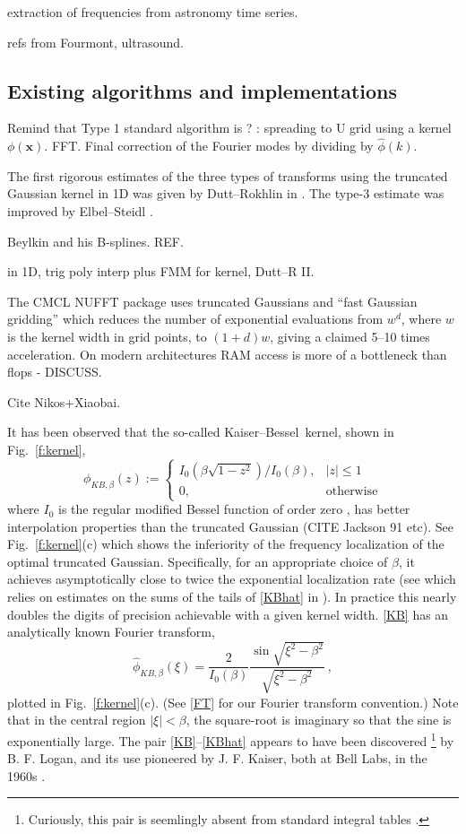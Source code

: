 \documentclass[10pt]{article}
\newcommand{\be}{\begin{equation}}
\newcommand{\ee}{\end{equation}}
\newcommand{\mbf}[1]{{\mathbf #1}}
\newcommand{\xx}{\mbf{x}}
\newcommand{\freq}{\beta}          %
\newcommand{\KB}{Kaiser--Bessel}
\begin{document}
extraction of frequencies from astronomy time series.

refs from Fourmont, ultrasound.



\subsection{Existing algorithms and implementations}

Remind that Type 1 standard algorithm is ? :
spreading to U grid using a kernel $\phi(\xx)$.
FFT.
Final correction of the Fourier modes by dividing by
$\hat\phi(k)$.

The first rigorous estimates of the three types of transforms
using the truncated Gaussian kernel in 1D was given by
Dutt--Rokhlin in \cite{dutt}.
The type-3 estimate was improved by Elbel--Steidl \cite{elbel}.


Beylkin and his B-splines. REF.

in 1D, trig poly interp plus FMM for kernel, Dutt--R II.

The CMCL NUFFT package \cite{cmcl} uses truncated Gaussians
and ``fast Gaussian gridding'' \cite[Sec.~3]{nufft}
which reduces the number of exponential evaluations
from $w^d$, where $w$ is the kernel width in grid points,
to $(1+d)w$, giving a claimed 5--10 times acceleration.
On modern architectures RAM access is more of a bottleneck than
flops - DISCUSS.

Cite Nikos+Xiaobai.

It has been observed that the so-called
\KB\ kernel, shown in Fig.~\ref{f:kernel},
\be
\phi_{KB,\freq}(z) := \left\{
\begin{array}{ll}I_0(\freq\sqrt{1-z^2}) / I_0(\freq), & |z|\le 1\\
  0,& \mbox{otherwise}\end{array}\right.
\label{KB}
\ee
where $I_0$ is the regular modified Bessel function of order zero
\cite[(10.25.2)]{dlmf}, has better interpolation
properties than the truncated Gaussian
(CITE Jackson 91 etc).
See Fig.~\ref{f:kernel}(c) which shows the inferiority of the
frequency localization of the optimal truncated Gaussian.
Specifically, for an appropriate choice of $\freq$, it achieves
asymptotically close to twice the exponential localization rate
(see \cite[p.19, (C.1) vs (C.4)]{nfft} which relies on
estimates on the sums of the tails of \eqref{KBhat}
in \cite{fourmontthesis,fourmont,pottshabil}).
In practice this nearly doubles the digits of precision achievable with
a given kernel width.
\eqref{KB} has an analytically known Fourier transform,
\be
\hat\phi_{KB,\freq}(\xi) = \frac{2}{I_0(\freq)}
\frac{\sin \sqrt{\xi^2-\freq^2}}{\sqrt{\xi^2-\freq^2}}
~,
\label{KBhat}
\ee
plotted in Fig.~\ref{f:kernel}(c).
(See \eqref{FT} for our Fourier transform convention.)
Note that in the central region $|\xi|<\freq$,
the square-root is imaginary so that the sine is exponentially large.
The pair \eqref{KB}--\eqref{KBhat}
appears to have been discovered%
\footnote{Curiously, this pair is
  seemlingly absent from standard integral tables \cite[\S 6.677]{GS8}
\cite[\S 2.5.25]{prudnikov1} \cite[\S 2.5.10]{prudnikov2}.}
by B. F. Logan, and its use pioneered by J. F. Kaiser, both at
Bell Labs, in the 1960s \cite{kaiser,kaiserinterview}.
\end{document}
